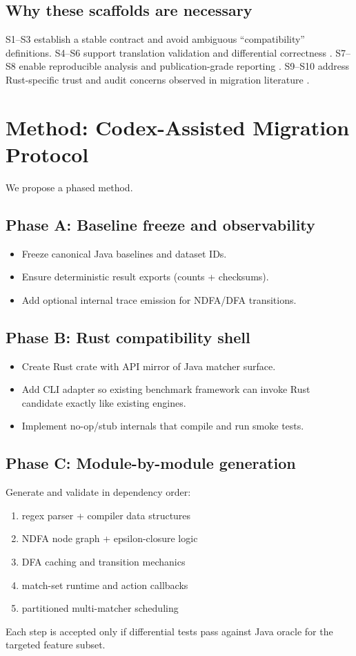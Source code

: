 \documentclass[11pt]{article}
\begin{document}
\subsection{Why these scaffolds are necessary}
S1--S3 establish a stable contract and avoid ambiguous ``compatibility'' definitions. S4--S6 support translation validation and differential correctness \cite{pnueli1998,claessen2000quickcheck,cadar2008klee}. S7--S8 enable reproducible analysis and publication-grade reporting \cite{georges2007,kalibera2013}. S9--S10 address Rust-specific trust and audit concerns observed in migration literature \cite{jung2018rustbelt,nguyen2022inrustwetrust,c2saferust2025}.

\section{Method: Codex-Assisted Migration Protocol}
We propose a phased method.

\subsection{Phase A: Baseline freeze and observability}
\begin{itemize}
  \item Freeze canonical Java baselines and dataset IDs.
  \item Ensure deterministic result exports (counts + checksums).
  \item Add optional internal trace emission for NDFA/DFA transitions.
\end{itemize}

\subsection{Phase B: Rust compatibility shell}
\begin{itemize}
  \item Create Rust crate with API mirror of Java matcher surface.
  \item Add CLI adapter so existing benchmark framework can invoke Rust candidate exactly like existing engines.
  \item Implement no-op/stub internals that compile and run smoke tests.
\end{itemize}

\subsection{Phase C: Module-by-module generation}
Generate and validate in dependency order:
\begin{enumerate}
  \item regex parser + compiler data structures
  \item NDFA node graph + epsilon-closure logic
  \item DFA caching and transition mechanics
  \item match-set runtime and action callbacks
  \item partitioned multi-matcher scheduling
\end{enumerate}
Each step is accepted only if differential tests pass against Java oracle for the targeted feature subset.
\end{document}
